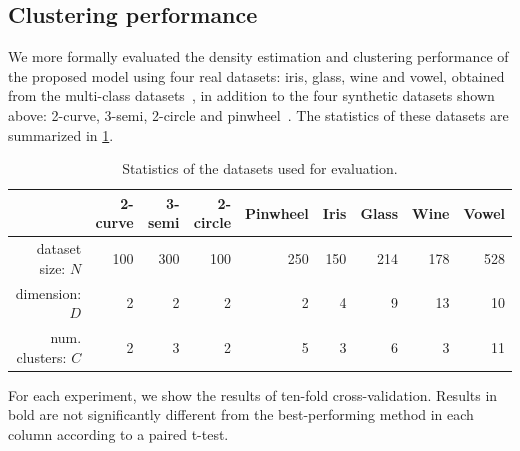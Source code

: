 
\subsection{Clustering performance}
We more formally evaluated the density estimation and clustering performance of the proposed model using four real datasets: iris, glass, wine and vowel, obtained from the \LIBSVM{} multi-class datasets~\citep{chang2011libsvm}, in addition to the four synthetic datasets shown above: 2-curve, 3-semi, 2-circle and pinwheel~\citep{adams2009archipelago}.
The statistics of these datasets are summarized in \cref{tab:statistics}.

\begin{table}[ht!]
\centering
\caption[Datasets used for evaluation of the \siwmm{}]
{Statistics of the datasets used for evaluation.}
\label{tab:statistics}
\begin{tabular}{rrrrrrrrr}
\hline
 & 2-curve & 3-semi & 2-circle & Pinwheel & Iris & Glass  & Wine  & Vowel  \\
\hline
dataset size: $N$ & 100 & 300 & 100 & 250 & 150 & 214 & 178 & 528 \\
dimension: $D$ & 2 & 2 & 2 & 2 & 4 & 9 & 13 & 10 \\
num. clusters: $C$ & 2 & 3 & 2 & 5 & 3 & 6 & 3 & 11 \\
\hline
\end{tabular}
\end{table}
%
For each experiment, we show the results of ten-fold cross-validation.
Results in bold are not significantly different from the best-performing method in each column according to a paired t-test.
%
%

